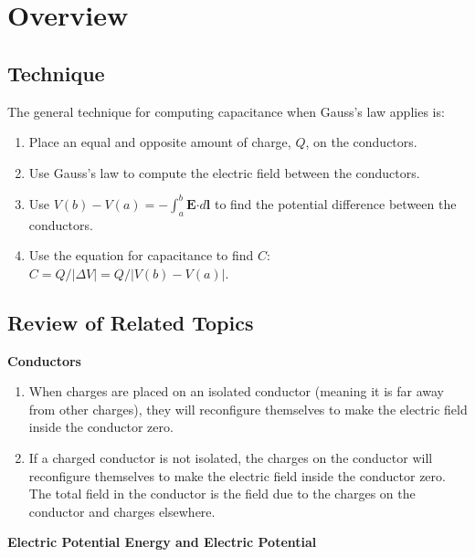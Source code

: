 \documentclass{article}
\newcommand{\bfcdot}[0]{\boldsymbol{\cdot}}
\begin{document}
\section{Overview}

\subsection{Technique}

The general technique for computing capacitance when Gauss's law applies is:

\begin{enumerate}

  \item Place an equal and opposite amount of charge, $Q$, on the conductors.

  \item Use Gauss's law to compute the electric field between the conductors.

  \item Use $V(b)-V(a)=-\int^b_a \mathbf{E}\bfcdot d\mathbf{l}$ to find the potential difference between the conductors.

  \item Use the equation for capacitance to find $C$: $C = Q/|\Delta V| = Q/|V(b)-V(a)|$.

\end{enumerate}

\subsection{Review of Related Topics}

\textbf{Conductors}

\begin{enumerate}

  \item When charges are placed on an isolated conductor (meaning it is far away from other charges), they will reconfigure themselves to make the electric field inside the conductor zero.

  \item If a charged conductor is not isolated, the charges on the conductor will reconfigure themselves to make the electric field inside the conductor zero. The total field in the conductor is the field due to the charges on the conductor and charges elsewhere.

\end{enumerate}

\textbf{Electric Potential Energy and Electric Potential}
\end{document}

